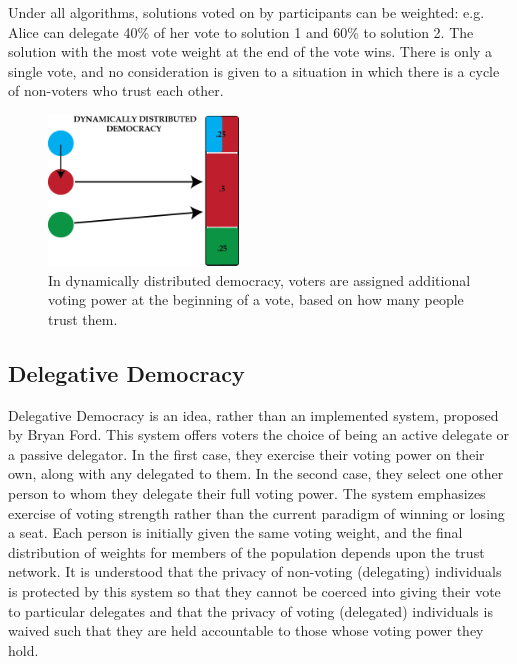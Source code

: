 \documentclass[a4paper]{acm_proc_article-sp}
\begin{document}
Under all algorithms, solutions voted on by participants can be weighted: e.g. Alice can delegate 40\% of her vote to
solution 1 and 60\% to solution 2.  The solution with the most vote weight at the end of the vote wins.  There is
only a single vote, and no consideration is given to a situation in which there is a cycle of non-voters who trust each other.

\begin{figure}
\centering
\includegraphics[width=0.45\textwidth]{figures/DDD.png}
\caption{In dynamically distributed democracy, voters are assigned additional voting power at the beginning of a vote, based on how many people trust them.}
\end{figure}

\subsection{Delegative Democracy}

Delegative Democracy \cite{delegative} is an idea, rather than an implemented system, proposed by Bryan Ford.  This system offers voters the
choice of being an active delegate or a passive delegator.  In the first case, they exercise their voting power on their own,
along with any delegated to them.  In the second case, they select one other person to whom they delegate their full voting power.
The system emphasizes exercise of voting strength rather than the current paradigm of winning or losing a seat.  Each person is
initially given the same voting weight, and the final distribution of weights for members of the population depends upon the
trust network.  It is understood that the privacy of non-voting (delegating) individuals is protected by this
system so that they cannot be coerced into giving their vote to particular delegates and that the privacy of voting (delegated)
individuals is waived such that they are held accountable to those whose voting power they hold.
\end{document}
